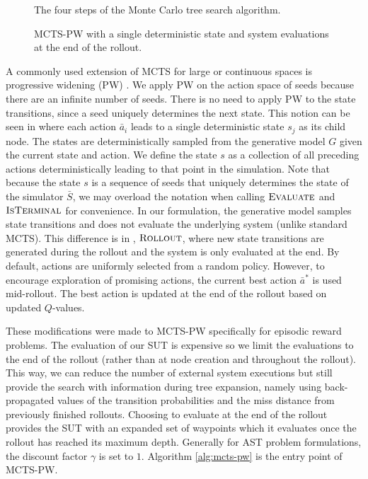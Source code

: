 \begin{figure*}[!t]
\centering
\resizebox{\textwidth}{!}{}
\caption{The four steps of the Monte Carlo tree search algorithm.}
\label{fig:mcts}
\end{figure*}

\begin{figure}[!b]
\centering
\resizebox{0.5\textwidth}{!}{}
\caption{MCTS-PW with a single deterministic state and system evaluations at the end of the rollout.}
\label{fig:mcts_pw}
\end{figure}
A commonly used extension of MCTS for large or continuous spaces is progressive widening (PW) \cite{chaslot2007progressive,mcts_ucb,ll_wildfire,mcts_wildfire}.
We apply PW on the action space of seeds because there are an infinite number of seeds.
There is no need to apply PW to the state transitions, since a seed uniquely determines the next state. 
This notion can be seen in  where each action $\bar{a}_i$ leads to a single deterministic state $s_j$ as its child node.
The states are deterministically sampled from the generative model $G$ given the current state and action.
We define the state $s$ as a collection of all preceding actions deterministically leading to that point in the simulation.
Note that because the state $s$ is a sequence of seeds that uniquely determines the state of the simulator $\bar{S}$, we may overload the notation when calling $\textsc{Evaluate}$ and $\textsc{IsTerminal}$ for convenience.
In our formulation, the generative model samples state transitions and does not evaluate the underlying system (unlike standard MCTS).
This difference is in , $\textsc{Rollout}$, where new state transitions are generated during the rollout and the system is only evaluated at the end.
By default, actions are uniformly selected from a random policy.
However, to encourage exploration of promising actions, the current best action $\bar{a}^*$ is used mid-rollout.
The best action is updated at the end of the rollout based on updated $Q$-values.


These modifications were made to MCTS-PW specifically for episodic reward problems.
The evaluation of our SUT is expensive so we limit the evaluations to the end of the rollout (rather than at node creation and throughout the rollout).
This way, we can reduce the number of external system executions but still provide the search with information during tree expansion, namely using back-propagated values of the transition probabilities and the miss distance from previously finished rollouts.
Choosing to evaluate at the end of the rollout provides the SUT with an expanded set of waypoints which it evaluates once the rollout has reached its maximum depth.
Generally for AST problem formulations, the discount factor $\gamma$ is set to $1$.
Algorithm \ref{alg:mcts-pw} is the entry point of MCTS-PW.

